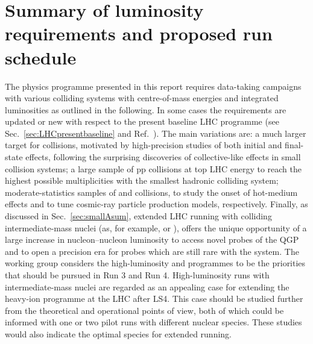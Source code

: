 \documentclass[../report.tex]{subfiles}
\begin{document}
\section{Summary of luminosity requirements and proposed run schedule}
\label{sec:schedule}

The physics programme presented in this report requires data-taking campaigns with various colliding systems with centre-of-mass energies and integrated luminosities \Lint as outlined in the following. In some cases the requirements are updated or new with respect to the present baseline LHC programme (see Sec.~\ref{sec:LHCpresentbaseline} and Ref.~\cite{Abelevetal:2014cna}). The main variations are: a much larger \Lint target for \pPb collisions, motivated by high-precision studies of both initial and final-state effects, following the surprising discoveries of collective-like effects in small collision systems; a large sample of pp collisions at top LHC energy to reach the highest possible multiplicities with the smallest hadronic colliding system; moderate-statistics samples of \OO and \pO collisions, to study the onset of hot-medium effects and to tune cosmic-ray particle production models, respectively. Finally, as discussed in Sec.~\ref{sec:smallAsum}, extended LHC running with colliding intermediate-mass nuclei (as, for example, \ArAr or \KrKr), offers the unique opportunity of a large increase in nucleon--nucleon luminosity to access novel probes of the QGP and to open a precision era for probes which are still rare with the \PbPb system. The working group considers the high-luminosity \PbPb and \pPb programmes to be the priorities that should be pursued in Run 3 and Run 4. High-luminosity runs with intermediate-mass nuclei are regarded as an appealing case for extending the heavy-ion programme at the LHC after LS4.
This case should be studied further from the theoretical and operational points of view, both of which could be informed with one or two pilot runs with different nuclear species. These studies would also indicate the optimal species for extended running.
\end{document}
